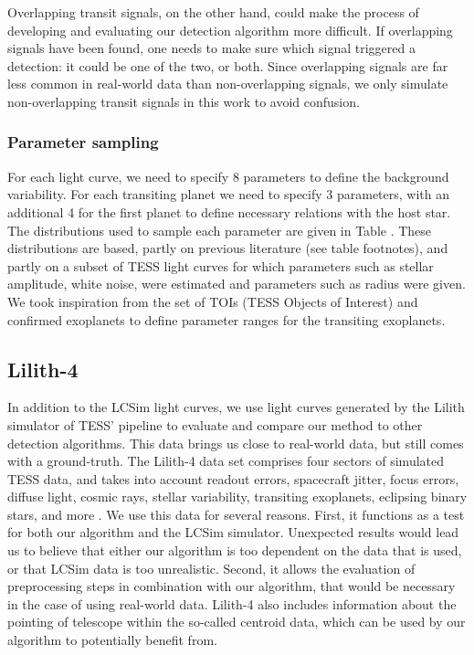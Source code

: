 Overlapping transit signals, on the other hand, could make the process of developing and evaluating our detection algorithm more difficult. If overlapping signals have been found, one needs to make sure which signal triggered a detection: it could be one of the two, or both. Since overlapping signals are far less common in real-world data than non-overlapping signals, we only simulate non-overlapping transit signals in this work to avoid confusion.

\subsubsection{Parameter sampling}
For each light curve, we need to specify 8 parameters to define the background variability. For each transiting planet we need to specify 3 parameters, with an additional 4 for the first planet to define necessary relations with the host star. The distributions used to sample each parameter are given in Table . These distributions are based, partly on previous literature (see table footnotes), and partly on a subset of TESS light curves for which parameters such as stellar amplitude, white noise, were estimated and parameters such as radius were given. We took inspiration from the set of TOIs (TESS Objects of Interest) and confirmed exoplanets to define parameter ranges for the transiting exoplanets.

\subsection{Lilith-4}
In addition to the LCSim light curves, we use light curves generated by the Lilith simulator of TESS' pipeline to evaluate and compare our method to other detection algorithms. This data brings us close to real-world data, but still comes with a ground-truth. The Lilith-4 data set comprises four sectors of simulated TESS data, and takes into account readout errors, spacecraft jitter, focus errors, diffuse light, cosmic rays, stellar variability, transiting exoplanets, eclipsing binary stars, and more \citep{osborn2020rapid}. We use this data for several reasons. First, it functions as a test for both our algorithm and the LCSim simulator. Unexpected results would lead us to believe that either our algorithm is too dependent on the data that is used, or that LCSim data is too unrealistic. Second, it allows the evaluation of preprocessing steps in combination with our algorithm, that would be necessary in the case of using real-world data. Lilith-4 also includes information about the pointing of telescope within the so-called centroid data, which can be used by our algorithm to potentially benefit from.